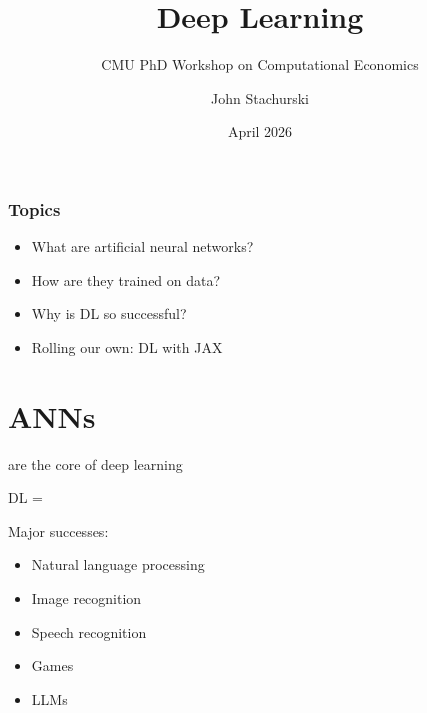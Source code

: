 \documentclass[xcolor=dvipsnames, 10pt]{beamer}
\title{Deep Learning}
\subtitle{CMU PhD Workshop on Computational Economics}
\author{John Stachurski}
\date{April 2026}
\begin{document}
\begin{frame}
  \titlepage
\end{frame}



\begin{frame}
    \frametitle{Topics}

    \begin{itemize}
        \item What are artificial neural networks?
        \vspace{0.5em}
        \item How are they trained on data?
        \vspace{0.5em}
        \item Why is DL so successful?
        \vspace{0.5em}
        \item Rolling our own: DL with JAX
    \end{itemize}

\end{frame}


\section{ANNs}

\begin{frame}
    
     are the core of deep learning

        \vspace{0.5em}
    DL = 

        \vspace{0.5em}
        \vspace{0.5em}
    Major successes:
    \begin{itemize}
        \item Natural language processing
        \vspace{0.3em}
        \item Image recognition
        \vspace{0.3em}
        \item Speech recognition
        \vspace{0.3em}
        \item Games
        \vspace{0.3em}
        \item LLMs
    \end{itemize}

\end{frame}
\end{document}
